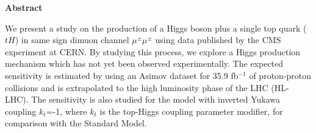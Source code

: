 \thispagestyle{empty}
\vspace*{2.2cm}
\begin{center}
	\Large \textbf{Abstract}
\end{center} 
\vspace{1.5cm}


We present a study on the production of a Higgs boson plus a single top quark ($tH$) in same sign dimuon channel $\mu^\pm \mu^\pm$ using data published by the CMS experiment at CERN. By studying this
process, we explore a Higgs production mechanism which has not yet been observed
experimentally. The expected sensitivity is estimated by using an Asimov dataset for 35.9 fb$^{-1}$ of proton-proton collisions and is extrapolated to the high luminosity phase of the LHC (HL-LHC).
The sensitivity is also studied for the model with inverted Yukawa coupling $k_t$=-1, where $k_t$ is the top-Higgs coupling parameter modifier, for comparison with the Standard Model.
